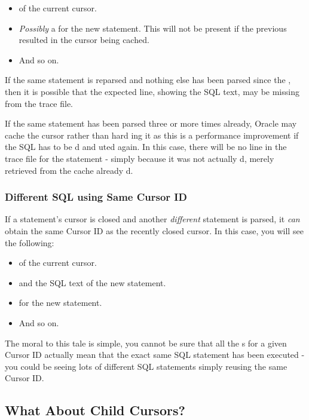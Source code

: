 \begin{itemize}
	\item {} of the current cursor.
	\item \emph{Possibly} a  for the new statement. This will not be present if the previous  resulted in the cursor being cached.
	\item And so on.
\end{itemize}

If the same statement is reparsed and nothing else has been parsed since the , then it is possible that the expected  line, showing the SQL text, may be missing from the trace file.

If the same statement has been parsed three or more times already, Oracle may cache the cursor rather than hard ing it as this is a performance improvement if the SQL has to be d and uted again. In this case, there will be no  line in the trace file for the statement - simply because it was not actually d, merely retrieved from the cache already d.

\subsubsection{Different SQL using Same Cursor ID}

If a statement's cursor is closed and another \emph{different} statement is parsed, it \emph{can} obtain the same Cursor ID as the recently closed cursor. In this case, you will see the following:

\begin{itemize}
	\item {} of the current cursor.
	\item {} and the SQL text of the new statement.
	\item {} for the new statement.
	\item And so on.
\end{itemize}

The moral to this tale is simple, you cannot be sure that all the s for a given Cursor ID actually mean that the exact same SQL statement has been executed - you could be seeing lots of different SQL statements simply reusing the same Cursor ID.

\subsection{What About Child Cursors?}

